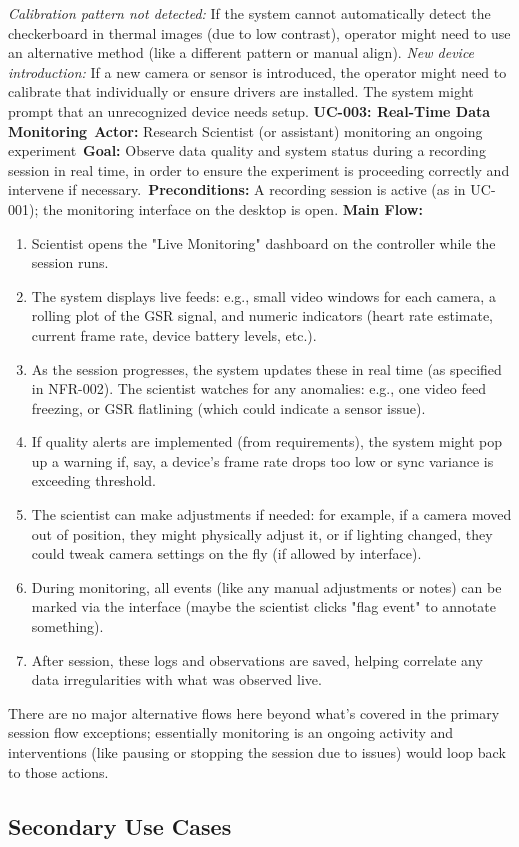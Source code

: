 \documentclass[11pt,a4paper]{report}
\begin{document}
\textit{Calibration pattern not detected:} If the system cannot automatically detect the checkerboard in thermal images (due to low contrast), operator might need to use an alternative method (like a different pattern or manual align).
\textit{New device introduction:} If a new camera or sensor is introduced, the operator might need to calibrate that individually or ensure drivers are installed. The system might prompt that an unrecognized device needs setup.
\vspace{1ex}
\noindent\textbf{UC-003: Real-Time Data Monitoring}\
\textbf{Actor:} Research Scientist (or assistant) monitoring an ongoing experiment\
\textbf{Goal:} Observe data quality and system status during a recording session in real time, in order to ensure the experiment is proceeding correctly and intervene if necessary.\
\textbf{Preconditions:} A recording session is active (as in UC-001); the monitoring interface on the desktop is open. \textbf{Main Flow:}
\begin{enumerate}
\item Scientist opens the "Live Monitoring" dashboard on the controller while the session runs.
\item The system displays live feeds: e.g., small video windows for each camera, a rolling plot of the GSR signal, and numeric indicators (heart rate estimate, current frame rate, device battery levels, etc.).
\item As the session progresses, the system updates these in real time (as specified in NFR-002). The scientist watches for any anomalies: e.g., one video feed freezing, or GSR flatlining (which could indicate a sensor issue).
\item If quality alerts are implemented (from requirements), the system might pop up a warning if, say, a device’s frame rate drops too low or sync variance is exceeding threshold.
\item The scientist can make adjustments if needed: for example, if a camera moved out of position, they might physically adjust it, or if lighting changed, they could tweak camera settings on the fly (if allowed by interface).
\item During monitoring, all events (like any manual adjustments or notes) can be marked via the interface (maybe the scientist clicks "flag event" to annotate something).
\item After session, these logs and observations are saved, helping correlate any data irregularities with what was observed live.
\end{enumerate} There are no major alternative flows here beyond what’s covered in the primary session flow exceptions; essentially monitoring is an ongoing activity and interventions (like pausing or stopping the session due to issues) would loop back to those actions. \subsection{Secondary Use Cases}
\end{document}
